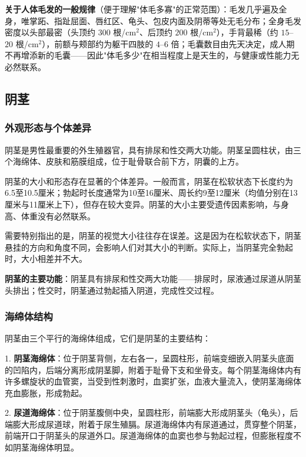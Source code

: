 \documentclass[12pt,a4paper,twoside]{ctexbook}
\begin{document}
\textbf{关于人体毛发的一般规律}（便于理解"体毛多寡"的正常范围）：毛发几乎遍及全身，唯掌跖、指趾屈面、唇红区、龟头、包皮内面及阴蒂等处无毛分布；全身毛发密度以头部最密（头顶约 $300$ 根/cm$^2$、后顶约 $200$ 根/cm$^2$），手背最稀（约 $15$--$20$ 根/cm$^2$），前额与颊部约为躯干四肢的 $4$--$6$ 倍；毛囊数目由先天决定，成人期不再增添新的毛囊——因此"体毛多少"在相当程度上是天生的，与健康或性能力无必然联系。


\subsection{阴茎}

\subsubsection{外观形态与个体差异}

阴茎是男性最重要的外生殖器官，具有排尿和性交两大功能。阴茎呈圆柱状，由三个海绵体、皮肤和筋膜组成，位于耻骨联合前下方，阴囊的上方。

阴茎的大小和形态存在显著的个体差异。一般而言，阴茎在松软状态下长度约为6.5至10.5厘米；勃起时长度通常为10至16厘米、周长约9至12厘米（均值分别在13厘米与11厘米上下），但存在较大变异。阴茎的大小主要受遗传因素影响，与身高、体重没有必然联系。

需要特别指出的是，阴茎的视觉大小往往存在误差。这是因为在松软状态下，阴茎悬挂的方向和角度不同，会影响人们对其大小的判断。实际上，当阴茎完全勃起时，大小相差并不大。

\textbf{阴茎的主要功能}：阴茎具有排尿和性交两大功能——排尿时，尿液通过尿道从阴茎头排出；性交时，阴茎通过勃起插入阴道，完成性交过程。

\subsubsection{海绵体结构}

阴茎由三个平行的海绵体组成，它们是阴茎的主要结构：

1. \textbf{阴茎海绵体}：位于阴茎背侧，左右各一，呈圆柱形，前端变细嵌入阴茎头底面的凹陷内，后端分离形成阴茎脚，附着于耻骨下支和坐骨支。每个阴茎海绵体内有许多螺旋状的血管窦，当受到性刺激时，血窦扩张，血液大量流入，使阴茎海绵体充血膨胀，形成勃起。

2. \textbf{尿道海绵体}：位于阴茎腹侧中央，呈圆柱形，前端膨大形成阴茎头（龟头），后端膨大形成尿道球，附着于尿生殖膈。尿道海绵体内有尿道通过，贯穿整个阴茎，前端开口于阴茎头的尿道外口。尿道海绵体的血窦也参与勃起过程，但膨胀程度不如阴茎海绵体明显。
\end{document}
